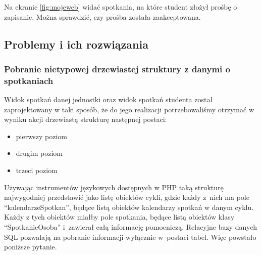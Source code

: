 \documentclass[licencjacka]{pracamgr}
\begin{document}
Na ekranie \ref{fig:mojeweb} widać spotkania, na które student złożył prośbę o zapisanie. Można sprawdzić, czy prośba została zaakceptowana.

\subsection{Problemy i ich rozwiązania}
\subsubsection{Pobranie nietypowej drzewiastej struktury z danymi o spotkaniach}
Widok spotkań danej jednostki oraz widok spotkań studenta został zaprojektowany w taki sposób, że do jego realizacji potrzebowaliśmy otrzymać w wyniku akcji drzewiastą strukturę następnej postaci:

\begin{itemize}
\item{pierwszy poziom}
\item{drugim poziom}
\item{trzeci poziom}
\end{itemize}

Używając instrumentów językowych dostępnych w PHP taką strukturę najwygodniej przedstawić jako listę obiektów cykli, gdzie każdy z~nich ma pole \enquote{kalendarzeSpotkan}, będące listą obiektów kalendarzy spotkań w danym cyklu. Każdy z tych obiektów miałby pole spotkania, będące listą obiektów klasy \enquote{SpotkanieOsoba} i~zawierał całą informację pomocniczą. Relacyjne bazy danych SQL pozwalają na pobranie informacji wyłącznie w~postaci tabel. Więc powstało poniższe pytanie.
\end{document}
